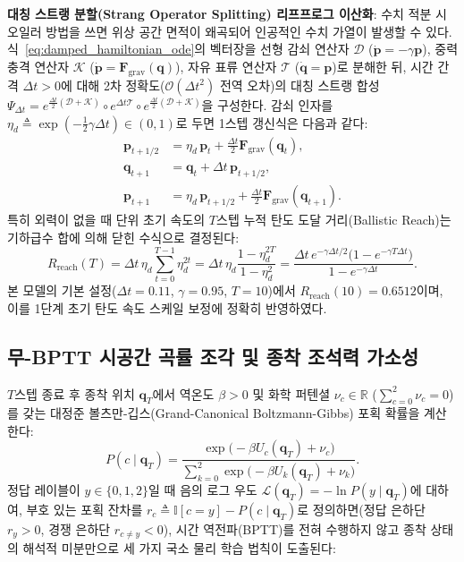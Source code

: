 \documentclass[11pt,a4paper]{article}
\begin{document}
\textbf{대칭 스트랭 분할(Strang Operator Splitting) 리프프로그 이산화}: 수치 적분 시 오일러 방법을 쓰면 위상 공간 면적이 왜곡되어 인공적인 수치 가열이 발생할 수 있다. 식~\eqref{eq:damped_hamiltonian_ode}의 벡터장을 선형 감쇠 연산자 $\mathcal{D}$ ($\dot{\mathbf{p}} = -\gamma\mathbf{p}$), 중력 충격 연산자 $\mathcal{K}$ ($\dot{\mathbf{p}} = \mathbf{F}_{\text{grav}}(\mathbf{q})$), 자유 표류 연산자 $\mathcal{T}$ ($\dot{\mathbf{q}} = \mathbf{p}$)로 분해한 뒤, 시간 간격 $\Delta t > 0$에 대해 2차 정확도($\mathcal{O}(\Delta t^2)$ 전역 오차)의 대칭 스트랭 합성 $\Psi_{\Delta t} = e^{\frac{\Delta t}{2}(\mathcal{D}+\mathcal{K})} \circ e^{\Delta t \mathcal{T}} \circ e^{\frac{\Delta t}{2}(\mathcal{D}+\mathcal{K})}$을 구성한다. 감쇠 인자를 $\eta_d \triangleq \exp(-\frac{1}{2}\gamma \Delta t) \in (0, 1)$로 두면 1스텝 갱신식은 다음과 같다:
\begin{align}
  \mathbf{p}_{t + 1/2} &= \eta_d \, \mathbf{p}_t + \frac{\Delta t}{2} \mathbf{F}_{\text{grav}}(\mathbf{q}_t), \nonumber \\
  \mathbf{q}_{t + 1} &= \mathbf{q}_t + \Delta t \, \mathbf{p}_{t + 1/2}, \label{eq:leapfrog} \\
  \mathbf{p}_{t + 1} &= \eta_d \, \mathbf{p}_{t + 1/2} + \frac{\Delta t}{2} \mathbf{F}_{\text{grav}}(\mathbf{q}_{t+1}). \nonumber
\end{align}
특히 외력이 없을 때 단위 초기 속도의 $T$스텝 누적 탄도 도달 거리(Ballistic Reach)는 기하급수 합에 의해 닫힌 수식으로 결정된다:
\begin{equation}
  R_{\text{reach}}(T) = \Delta t \, \eta_d \sum_{t=0}^{T-1} \eta_d^{2t} = \Delta t \, \eta_d \frac{1 - \eta_d^{2T}}{1 - \eta_d^2} = \frac{\Delta t \, e^{-\gamma\Delta t/2}\big(1 - e^{-\gamma T \Delta t}\big)}{1 - e^{-\gamma\Delta t}}.
\end{equation}
본 모델의 기본 설정($\Delta t = 0.11$, $\gamma = 0.95$, $T = 10$)에서 $R_{\text{reach}}(10) = 0.6512$이며, 이를 1단계 초기 탄도 속도 스케일 보정에 정확히 반영하였다.

\subsection{\texorpdfstring{무-BPTT 시공간 곡률 조각 및 종착 조석력 가소성}{무-BPTT 시공간 곡률 조각 및 종착 조석력 가소성}}

$T$스텝 종료 후 종착 위치 $\mathbf{q}_T$에서 역온도 $\beta > 0$ 및 화학 퍼텐셜 $\nu_c \in \mathbb{R}$ ($\sum_{c=0}^2 \nu_c = 0$)를 갖는 대정준 볼츠만-깁스(Grand-Canonical Boltzmann-Gibbs) 포획 확률을 계산한다:
\begin{equation}
  P(c \mid \mathbf{q}_T) = \frac{\exp\!\big(-\beta U_c(\mathbf{q}_T) + \nu_c\big)}{\sum_{k=0}^{2} \exp\!\big(-\beta U_k(\mathbf{q}_T) + \nu_k\big)}.
\end{equation}
정답 레이블이 $y \in \{0, 1, 2\}$일 때 음의 로그 우도 $\mathcal{L}(\mathbf{q}_T) = -\ln P(y \mid \mathbf{q}_T)$에 대하여, 부호 있는 포획 잔차를 $r_c \triangleq \mathbb{I}[c = y] - P(c \mid \mathbf{q}_T)$로 정의하면(정답 은하단 $r_y > 0$, 경쟁 은하단 $r_{c \neq y} < 0$), 시간 역전파(BPTT)를 전혀 수행하지 않고 종착 상태의 해석적 미분만으로 세 가지 국소 물리 학습 법칙이 도출된다:
\end{document}
